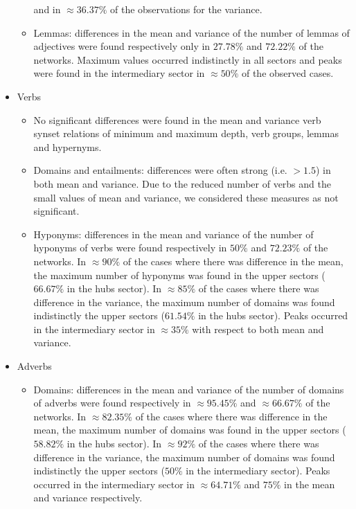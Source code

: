 \begin{itemize}
\begin{itemize}
				and in $\approx 36.37\%$ of the observations for the variance.
			\item Lemmas:
				differences in the mean and variance of the number of lemmas of adjectives were found respectively only in $27.78\%$ and $72.22\%$ of the networks.
				Maximum values occurred indistinctly in all sectors and peaks were found in the intermediary sector in $\approx 50\%$ of the observed cases.
		\end{itemize}
	\item Verbs
		\begin{itemize}
			\item No significant differences were found in the mean and variance verb synset relations of minimum and maximum depth, verb groups, lemmas and hypernyms.
			\item Domains and entailments:
				differences were often strong (i.e. $>1.5$) in both mean and variance.
				Due to the reduced number of verbs and the small values of mean and variance,
				we considered these measures as not significant.
			\item Hyponyms:
				differences in the mean and variance of the number of hyponyms of verbs were found respectively in $50\%$ and $72.23\%$ of the networks.
				In $\approx 90\%$ of the cases where there was difference in the mean, 
				the maximum number of hyponyms was found in the upper sectors ($66.67\%$ in the hubs sector).
				In $\approx 85\%$ of the cases where there was difference in the variance, 
				the maximum number of domains was found indistinctly the upper sectors ($61.54\%$ in the hubs sector).
				Peaks occurred in the intermediary sector in $\approx 35\%$ with respect to both mean and variance.
		\end{itemize}
	\item Adverbs
		\begin{itemize}
			\item Domains:
				differences in the mean and variance of the number of domains of adverbs were found respectively in $\approx 95.45\%$ and $\approx 66.67\%$ of the networks.
				In $\approx 82.35\%$ of the cases where there was difference in the mean, 
				the maximum number of domains was found in the upper sectors ($58.82\%$ in the hubs sector).
				In $\approx 92\%$ of the cases where there was difference in the variance, 
				the maximum number of domains was found indistinctly the upper sectors ($50\%$ in the intermediary sector).
				Peaks occurred in the intermediary sector in $\approx 64.71\%$ and $75\%$ in the mean and variance respectively.
		\end{itemize}
\end{itemize}
